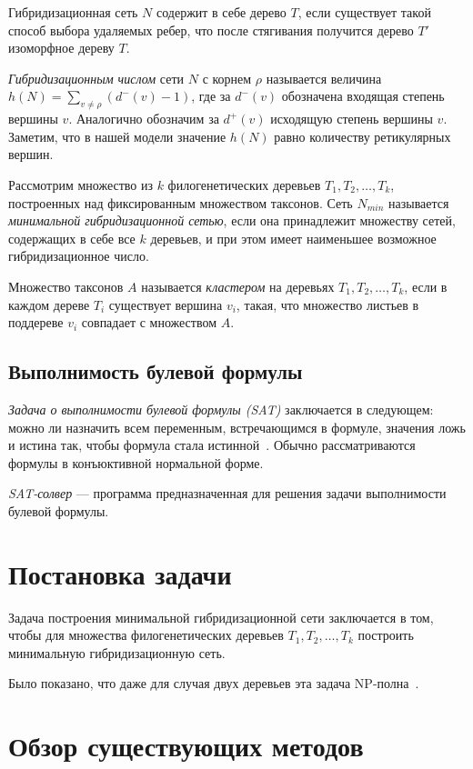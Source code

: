 Гибридизационная сеть $N$ содержит в себе дерево $T$, если существует такой способ выбора удаляемых ребер, что после стягивания получится дерево $T'$ изоморфное дереву $T$.

\emph{Гибридизационным числом} сети $N$ с корнем $\rho$ называется величина $h(N) = \sum\limits_{v \ne \rho} (d^-(v) - 1)$, где за $d^-(v)$ обозначена входящая степень вершины $v$.
Аналогично обозначим за $d^+(v)$ исходящую степень вершины $v$.
Заметим, что в нашей модели значение $h(N)$ равно количеству ретикулярных вершин.

Рассмотрим множество из $k$ филогенетических деревьев $T_1, T_2, \dots, T_k$, построенных над фиксированным множеством таксонов.
Сеть $N_{min}$ называется \emph{минимальной гибридизационной сетью}, если она принадлежит множеству сетей, содержащих в себе все $k$ деревьев, и при этом имеет наименьшее возможное гибридизационное число.

Множество таксонов $A$ называется \emph{кластером} на деревьях $T_1, T_2, \dots, T_k$, если в каждом дереве $T_i$ существует вершина $v_i$, такая, что множество листьев в поддереве $v_i$ совпадает с множеством $A$.

\subsection{Выполнимость булевой формулы}

\emph{Задача о выполнимости булевой формулы (SAT)} заключается в следующем: можно ли назначить всем переменным, встречающимся в формуле, значения ложь и истина так, чтобы формула стала истинной~\cite{wiki:sat}. Обычно рассматриваются формулы в конъюктивной нормальной форме.

\emph{SAT-солвер} --- программа предназначенная для решения задачи выполнимости булевой формулы.

\FloatBarrier
\section{Постановка задачи}

Задача построения минимальной гибридизационной сети заключается в том, чтобы для множества филогенетических деревьев $T_1, T_2, \dots, T_k$ построить минимальную гибридизационную сеть.

Было показано, что даже для случая двух деревьев эта задача NP-полна~\cite {bordewich2007computing}.

\FloatBarrier
\section{Обзор существующих методов}
